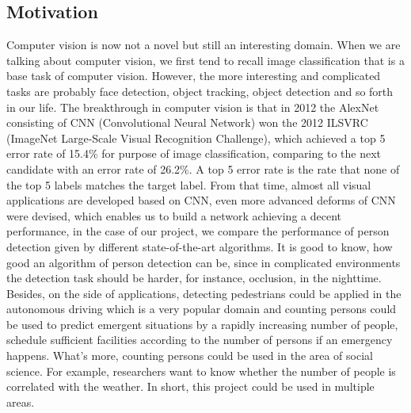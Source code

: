 \documentclass[runningheads]{llncs}
\begin{document}
\subsection{Motivation}
Computer vision is now not a novel but still an interesting domain. When we are talking about computer vision, we first tend to recall image classification that is a base task of computer vision. However, the more interesting and complicated tasks are probably face detection, object tracking, object detection and so forth in our life. The breakthrough in computer vision is that in 2012 the AlexNet consisting of CNN (Convolutional Neural Network) won the 2012 ILSVRC (ImageNet Large-Scale Visual Recognition Challenge), which achieved a  top 5 error rate of 15.4\% for purpose of image classification, comparing to the next candidate with an error rate of 26.2\%. A top 5 error rate is the rate that none of the top 5 labels matches the target label. From that time, almost all visual applications are developed based on CNN, even more advanced deforms of CNN were devised, which enables us to build a network achieving a decent performance, in the case of our project, we compare the performance of person detection given by different state-of-the-art algorithms. It is good to know, how good an algorithm of person detection can be, since in complicated environments the detection task should be harder, for instance, occlusion, in the nighttime. Besides, on the side of applications, detecting pedestrians could be applied in the autonomous driving which is a very popular domain and counting persons could be used to predict emergent situations by a rapidly increasing number of people, schedule sufficient facilities according to the number of persons if an emergency happens. What’s more, counting persons could be used in the area of social science. For example, researchers want to know whether the number of people is correlated with the weather. In short, this project could be used in multiple areas.


\end{document}

